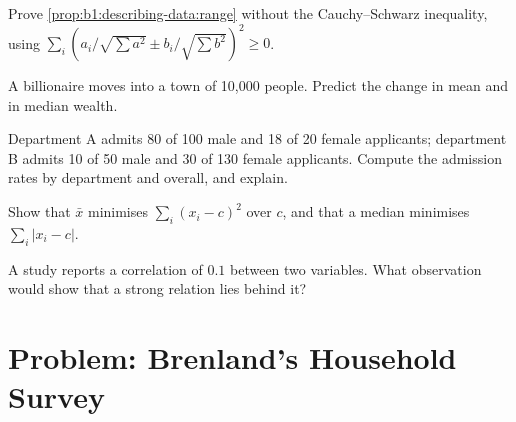 \begin{exercise}[$\star\star$]\label{exo:b1:describing-data:prove}
Prove \cref{prop:b1:describing-data:range} without the Cauchy--Schwarz inequality, using
$\sum_i (a_i/\sqrt{\sum a^2} \pm b_i/\sqrt{\sum b^2})^2 \ge 0$.
\end{exercise}

\begin{exercise}[$\star\star$]\label{exo:b1:describing-data:billionaire}
A billionaire moves into a town of 10,000 people. Predict the change in
mean and in median wealth.
\end{exercise}

\begin{exercise}[$\star\star\star$]\label{exo:b1:describing-data:build}
Department A admits 80 of 100 male and 18 of 20 female applicants;
department B admits 10 of 50 male and 30 of 130 female applicants. Compute
the admission rates by department and overall, and explain.
\end{exercise}

\begin{exercise}[$\star\star\star$]\label{exo:b1:describing-data:minimise}
Show that $\bar x$ minimises $\sum_i (x_i - c)^2$ over $c$, and that a median minimises
$\sum_i |x_i - c|$.
\end{exercise}

\begin{exercise}[$\star\star\star$]\label{exo:b1:describing-data:hidden}
A study reports a correlation of $0.1$ between two variables. What
observation would show that a strong relation lies behind it?
\end{exercise}

\section{Problem: Brenland's Household Survey}\label{sec:b1:describing-data:problem}

